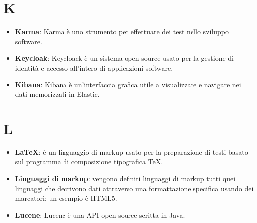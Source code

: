 \documentclass[a4paper, oneside, openany, dvipsnames, table]{article}
\begin{document}
\section{K}
\begin{itemize}
\item \textbf{Karma}: Karma è uno strumento per effettuare dei test nello sviluppo software. 
\item \textbf{Keycloak}: Keycloack è un sistema open-source usato per la gestione di identità e accesso all'intero di applicazioni software.
\item \textbf{Kibana}: Kibana è un'interfaccia grafica utile a visualizzare e navigare nei dati memorizzati in Elastic.
\end{itemize}

\section{L}
\begin{itemize}
\item \textbf{\LaTeX}: è un linguaggio di markup usato per la preparazione di testi basato sul programma di composizione tipografica \TeX.
\item \textbf{Linguaggi di markup}: vengono definiti linguaggi di markup tutti quei linguaggi che decrivono dati attraverso una formattazione specifica usando dei marcatori; un esempio è HTML5.
\item \textbf{Lucene}: Lucene è una API open-source scritta in Java.
\end{itemize}
\end{document}
